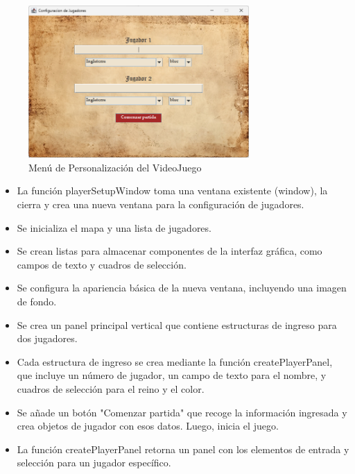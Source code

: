 \documentclass{article}
\begin{document}
    \begin{figure}[H]
        \centering
		\includegraphics[width=0.75\textwidth,keepaspectratio]{img/Menu_Configuracion.png}
        \caption{Menú de Personalización del VideoJuego}
    \end{figure}

    \begin{itemize}	
		\item La función playerSetupWindow toma una ventana existente (window), la cierra y crea una nueva ventana para la configuración de jugadores.
            \item Se inicializa el mapa y una lista de jugadores.
            \item Se crean listas para almacenar componentes de la interfaz gráfica, como campos de texto y cuadros de selección.
            \item Se configura la apariencia básica de la nueva ventana, incluyendo una imagen de fondo.
            \item Se crea un panel principal vertical que contiene estructuras de ingreso para dos jugadores.
            \item Cada estructura de ingreso se crea mediante la función createPlayerPanel, que incluye un número de jugador, un campo de texto para el nombre, y cuadros de selección para el reino y el color.
            \item Se añade un botón "Comenzar partida" que recoge la información ingresada y crea objetos de jugador con esos datos. Luego, inicia el juego.
            \item La función createPlayerPanel retorna un panel con los elementos de entrada y selección para un jugador específico.
	\end{itemize}
\end{document}
